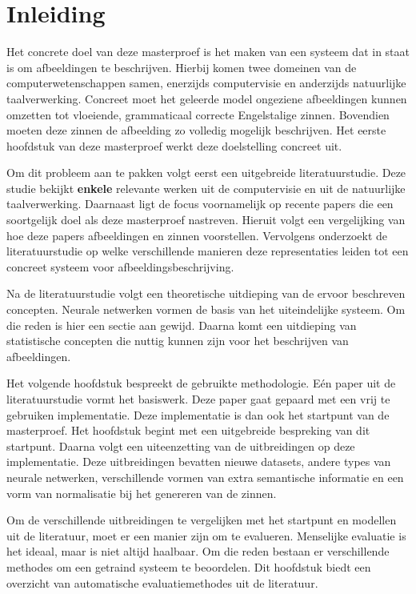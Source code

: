 \chapter{Inleiding}
\label{inleiding}

Het concrete doel van deze masterproef is het maken van een systeem dat in staat is om afbeeldingen te beschrijven. Hierbij komen twee domeinen van de computerwetenschappen samen, enerzijds computervisie en anderzijds natuurlijke taalverwerking. Concreet moet het geleerde model ongeziene afbeeldingen kunnen omzetten tot vloeiende, grammaticaal correcte Engelstalige zinnen. Bovendien moeten deze zinnen de afbeelding zo volledig mogelijk beschrijven. Het eerste hoofdstuk van deze masterproef werkt deze doelstelling concreet uit.


Om dit probleem aan te pakken volgt eerst een uitgebreide literatuurstudie. Deze studie bekijkt \textbf{enkele} relevante werken uit de computervisie en uit de natuurlijke taalverwerking. Daarnaast ligt de focus voornamelijk op recente papers die een soortgelijk doel als deze masterproef nastreven. Hieruit volgt een vergelijking van hoe deze papers afbeeldingen en zinnen voorstellen. Vervolgens onderzoekt de literatuurstudie op welke verschillende manieren deze representaties leiden tot een concreet systeem voor afbeeldingsbeschrijving.

Na de literatuurstudie volgt een theoretische uitdieping van de ervoor beschreven concepten. Neurale netwerken vormen de basis van het uiteindelijke systeem. Om die reden is hier een sectie aan gewijd. Daarna komt een uitdieping van statistische concepten die nuttig kunnen zijn voor het beschrijven van afbeeldingen.

Het volgende hoofdstuk bespreekt de gebruikte methodologie.
E\'en paper uit de literatuurstudie vormt het basiswerk. Deze paper gaat gepaard met een vrij te gebruiken implementatie. Deze implementatie is dan ook het startpunt van de masterproef. Het hoofdstuk begint met een uitgebreide bespreking van dit startpunt.
Daarna volgt een uiteenzetting van de uitbreidingen op deze implementatie. Deze uitbreidingen bevatten nieuwe datasets, andere types van neurale netwerken, verschillende vormen van extra semantische informatie en een vorm van normalisatie bij het genereren van de zinnen.

Om de verschillende uitbreidingen te vergelijken met het startpunt en modellen uit de literatuur, moet er een manier zijn om te evalueren. Menselijke evaluatie is het ideaal, maar is niet altijd haalbaar. Om die reden bestaan er verschillende methodes om een getraind systeem te beoordelen. Dit hoofdstuk biedt een overzicht van automatische evaluatiemethodes uit de literatuur.

